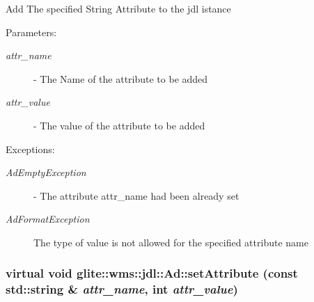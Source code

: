 Add The specified String Attribute to the jdl istance \begin{Desc}
\item[Parameters:]
\begin{description}
\item[{\em attr\_\-name}]- The Name of the attribute to be added \item[{\em attr\_\-value}]- The value of the attribute to be added \end{description}
\end{Desc}
\begin{Desc}
\item[Exceptions:]
\begin{description}
\item[{\em Ad\-Empty\-Exception}]- The attribute attr\_\-name had been already set \item[{\em Ad\-Format\-Exception}]The type of value is not allowed for the specified attribute name \end{description}
\end{Desc}
\hypertarget{classglite_1_1wms_1_1jdl_1_1Ad_z19_9}{
\subsubsection[setAttribute]{\setlength{\rightskip}{0pt plus 5cm}virtual void glite::wms::jdl::Ad::set\-Attribute (const std::string \& {\em attr\_\-name}, int {\em attr\_\-value})}}
\label{classglite_1_1wms_1_1jdl_1_1Ad_z19_9}


